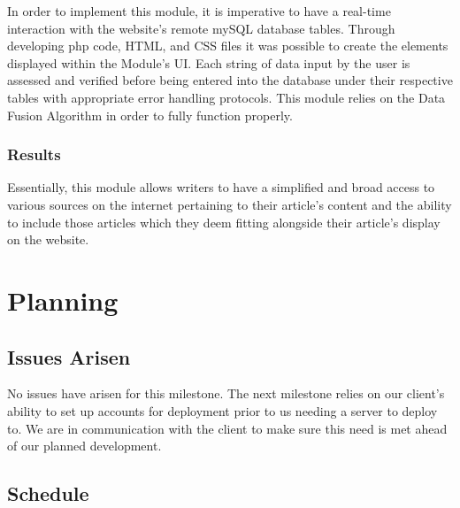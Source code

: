 \documentclass[12pt]{article} %
\begin{document}
In order to implement this module, it is imperative to have a real-time interaction with the website’s remote mySQL database tables. Through developing php code, HTML, and CSS files it was possible to create the elements displayed within the Module’s UI. Each string of data input by the user is assessed and verified before being entered into the database under their respective tables with appropriate error handling protocols. This module relies on the Data Fusion Algorithm in order to fully function properly.

\subsubsection{Results}

Essentially, this module allows writers to have a simplified and broad access to various sources on the internet pertaining to their article’s content and the ability to include those articles which they deem fitting alongside their article’s display on the website.

\section{Planning}

\subsection{Issues Arisen}

No issues have arisen for this milestone. The next milestone relies on our client’s ability to set up accounts for deployment prior to us needing a server to deploy to. We are in communication with the client to make sure this need is met ahead of our planned development.

\subsection{Schedule}
\end{document}
